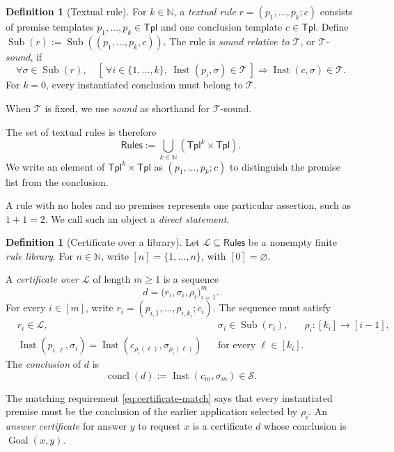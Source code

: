 \documentclass[11pt,twoside]{article}
\theoremstyle{definition}
\newtheorem{definition}[theorem]{Definition}
\newcommand{\Stext}{\mathcal S}
\newcommand{\True}{\mathcal T}
\newcommand{\Lib}{\mathcal L}
\newcommand{\Tpl}{\mathsf{Tpl}}
\newcommand{\Rules}{\mathsf{Rules}}
\newcommand{\Goal}{\operatorname{Goal}}
\newcommand{\Inst}{\operatorname{Inst}}
\newcommand{\Subs}{\operatorname{Sub}}
\begin{document}
\begin{definition}[Textual rule]
For $k\in\mathbb N$, a \emph{textual rule} $r=(p_1,\ldots,p_k;c)$ consists of
premise templates $p_1,\ldots,p_k\in\Tpl$ and one conclusion template
$c\in\Tpl$. Define
$\Subs(r):=\Subs((p_1,\ldots,p_k,c))$. The rule is \emph{sound relative to
$\True$}, or \emph{$\True$-sound}, if
\begin{equation}
\forall\sigma\in\Subs(r),\quad
 \left[\ \forall i\in\{1,\ldots,k\},\ \Inst(p_i,\sigma)\in\True\ \right]
 \Longrightarrow \Inst(c,\sigma)\in\True.
\label{eq:rule-sound}
\end{equation}
For $k=0$, every instantiated conclusion must belong to $\True$.
\end{definition}
When $\True$ is fixed, we use \emph{sound} as shorthand for
$\True$-sound.

The set of textual rules is therefore
\[
 \Rules:=\bigcup_{k\in\mathbb N}(\Tpl^k\times\Tpl).
\]
We write an element of $\Tpl^k\times\Tpl$ as
$(p_1,\ldots,p_k;c)$ to distinguish the premise list from the conclusion.

A rule with no holes and no premises represents one particular assertion,
such as $1+1=2$. We call such an object a \emph{direct statement}.
\begin{definition}[Certificate over a library]
Let $\Lib\subseteq\Rules$ be a nonempty finite \emph{rule library}. For
$n\in\mathbb N$, write
$[n]=\{1,\ldots,n\}$, with $[0]=\varnothing$.

A \emph{certificate over $\Lib$} of length $m\geq 1$ is a sequence
\[
 d=\bigl(r_i,\sigma_i,\rho_i\bigr)_{i=1}^m.
\]
For every $i\in[m]$, write
$r_i=(p_{i,1},\ldots,p_{i,k_i};c_i)$. The sequence must satisfy
\begin{align}
 &r_i\in\Lib,
 &&\sigma_i\in\Subs(r_i),
 &&\rho_i:[k_i]\longrightarrow[i-1],
 \label{eq:certificate-types}\\
 &\Inst(p_{i,\ell},\sigma_i)
   =\Inst(c_{\rho_i(\ell)},\sigma_{\rho_i(\ell)})
 &&\text{for every }\ell\in[k_i].
 \label{eq:certificate-match}
\end{align}
The \emph{conclusion} of $d$ is
\begin{equation}
 \operatorname{concl}(d):=\Inst(c_m,\sigma_m)\in\Stext.
 \label{eq:certificate-conclusion}
\end{equation}
\end{definition}

The matching requirement \cref{eq:certificate-match} says that every instantiated premise must be the conclusion of the earlier
application selected by $\rho_i$. An \emph{answer certificate} for answer
$y$ to request $x$ is a certificate $d$ whose conclusion is
$\Goal(x,y)$.
\end{document}
